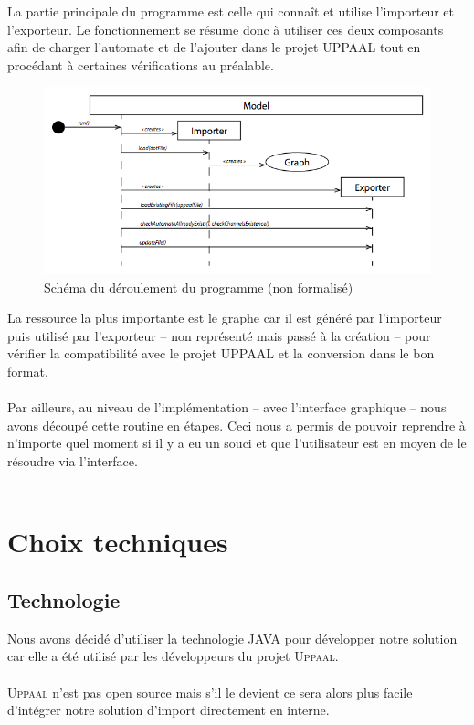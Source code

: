 \documentclass[12pt,a4paper]{report}
\begin{document}
La partie principale du programme est celle qui connaît et utilise l'importeur 
et l'exporteur. Le fonctionnement se résume donc à utiliser ces deux composants
afin de charger l'automate et de l'ajouter dans le projet UPPAAL tout en procédant
à certaines vérifications au préalable.

\begin{figure}[H]
  \centering
  \includegraphics[scale=0.6]{ressources/deroulement.png}
  \caption{Schéma du déroulement du programme (non formalisé)}
\end{figure}

La ressource la plus importante est le graphe car il est généré par l'importeur 
puis utilisé par l'exporteur -- non représenté mais passé à la création -- pour 
vérifier la compatibilité avec le projet UPPAAL et la conversion dans le bon format.
\\\\
Par ailleurs, au niveau de l'implémentation -- avec l'interface graphique -- nous 
avons découpé cette routine en étapes. Ceci nous a permis de pouvoir reprendre 
à n'importe quel moment si il y a eu un souci et que l'utilisateur est en moyen de 
le résoudre via l'interface.
\\\\

\section{Choix techniques}
\subsection*{Technologie}
Nous avons décidé d'utiliser la technologie JAVA pour développer notre 
solution car elle a été utilisé par les développeurs du projet \textsc{Uppaal}.
\\\\
\textsc{Uppaal} n'est pas open source mais s'il le devient ce sera alors plus facile d'intégrer
notre solution d'import directement en interne.
\end{document}

